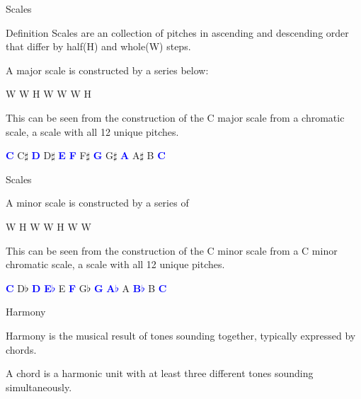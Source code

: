 \documentclass{beamer}
\begin{document}
\begin{frame}{Scales}
    \begin{block}{Definition}
    Scales are an collection of pitches in ascending and descending order that differ by half(H) and whole(W) steps.
    \end{block}
    
    \begin{Example}
    A major scale is constructed by a series below:
    \begin{center}
    W W H W W W H 
    \end{center}
    This can be seen from the construction of the C major scale from a chromatic scale, a scale with all 12 unique pitches.
    \begin{center} \textcolor{blue}{\textbf{C}} C$\sharp$ \textcolor{blue}{\textbf{D}} D$\sharp$ \textcolor{blue}{\textbf{E}} \textcolor{blue}{\textbf{F}} F$\sharp$ \textcolor{blue}{\textbf{G}} G$\sharp$ \textcolor{blue}{\textbf{A}} A$\sharp$ B \textcolor{blue}{\textbf{C}}
\end{center}
    \end{Example}
\end{frame}
\begin{frame}{Scales}
\begin{Example}
    A minor scale is constructed by a series of
    \begin{center}
    W H W W H W W
    \end{center}
    This can be seen from the construction of the C minor scale from a C minor chromatic scale, a scale with all 12 unique pitches.
    \begin{center} \textcolor{blue}{\textbf{C}} D$\flat$
    \textcolor{blue}{\textbf{D}} \textcolor{blue}{\textbf{E$\flat$}} E \textcolor{blue}{\textbf{F}} G$\flat$ \textcolor{blue}{\textbf{G}} \textcolor{blue}{\textbf{A$\flat$}} A \textcolor{blue}{\textbf{B$\flat$}} B \textcolor{blue}{\textbf{C}}
\end{center}
    \end{Example}
\end{frame}

\begin{frame}{Harmony}

\begin{Definition}
   Harmony is the musical result of tones sounding together, typically expressed by chords.
\end{Definition}
\begin{Definition}
A chord is a harmonic unit with at least three different tones sounding simultaneously. 

\end{Definition}
\end{frame}
\end{document}
